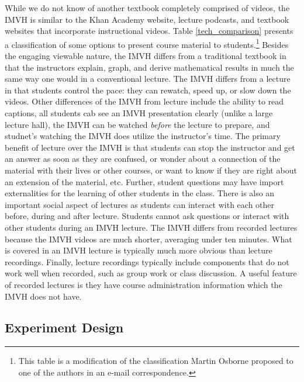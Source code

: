 \documentclass[12pt]{article}
\begin{document}
While we do not know of another textbook completely comprised of videos, the IMVH is similar to the Khan Academy website, lecture podcasts, and textbook websites that incorporate instructional videos. 
 Table \ref{tech_comparison} presents a classification of some options to present course material to students.\footnote{This table is a modification of the classification Martin Osborne proposed to one of the authors in an e-mail correspondence.} Besides the engaging viewable nature, the IMVH differs from a traditional textbook in that the instructors explain, graph, and derive mathematical results in much the same way one would in a conventional lecture. The IMVH differs from a lecture in that students control the pace: they can rewatch, speed up, or slow down the videos. Other differences of the IMVH from lecture include the ability to read captions, all students cab see an IMVH presentation clearly (unlike a large lecture hall), the IMVH can be watched \textit{before} the lecture to prepare, and studnet's watching the IMVH does utilize the instructor's time. The primary benefit of lecture over the IMVH is that students can stop the instructor and get an answer as soon as they are confused, or wonder about a connection of the material with their lives or other courses, or want to know if they are right about an extension of the material, etc. Further, student questions may have import externalities for the learning of other students in the class. There is also an important social aspect of lectures as students can interact with each other before, during and after lecture. Students cannot ask questions or interact with other students during an IMVH lecture. The IMVH differs from recorded lectures because the IMVH videos are much shorter, averaging under ten minutes. What is covered in an IMVH lecture is typically much more obvious than lecture recordings.  Finally, lecture recordings typically include components that do not work well when recorded, such as group work or class discussion. A useful feature of recorded lectures is they have course administration information which the IMVH does not have. 

\subsection{Experiment Design} \label{expdesign}
\end{document}
